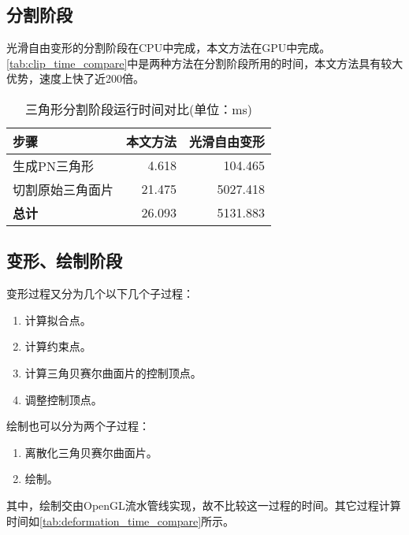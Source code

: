 \subsection{分割阶段}
光滑自由变形的分割阶段在CPU中完成，本文方法在GPU中完成。\autoref{tab:clip_time_compare}中是两种方法在分割阶段所用的时间，本文方法具有较大优势，速度上快了近200倍。

\begin{table}[htbp]
    \centering
    \begin{tabular}{lrr}
    \toprule
    \textbf{步骤}   & \textbf{本文方法} & \textbf{光滑自由变形\cite{Cui15}} \\
    \midrule
    生成PN三角形    & 4.618             & 104.465                           \\
    切割原始三角面片& 21.475            & 5027.418                          \\
    \midrule
    \textbf{总计}   & 26.093            & 5131.883                          \\
    \bottomrule
    \end{tabular}
    \caption{三角形分割阶段运行时间对比(单位：ms)}\label{tab:clip_time_compare}
\end{table}

\subsection{变形、绘制阶段}
变形过程又分为几个以下几个子过程：
\begin{enumerate}
    \item 计算拟合点。
    \item 计算约束点。
    \item 计算三角贝赛尔曲面片的控制顶点。
    \item 调整控制顶点。
\end{enumerate}

绘制也可以分为两个子过程：
\begin{enumerate}
    \item 离散化三角贝赛尔曲面片。
    \item 绘制。
\end{enumerate}

其中，绘制交由OpenGL流水管线实现，故不比较这一过程的时间。其它过程计算时间如\autoref{tab:deformation_time_compare}所示。

